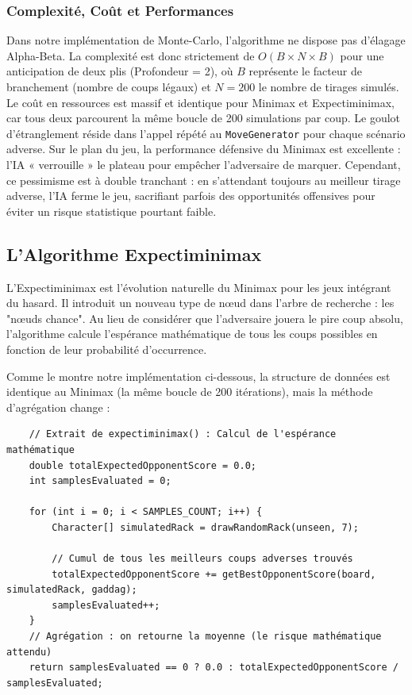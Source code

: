 \documentclass[a4paper]{article}
\begin{document}
    \subsubsection{Complexité, Coût et Performances}
	Dans notre implémentation de Monte-Carlo, l'algorithme ne dispose pas d'élagage Alpha-Beta. La complexité est donc strictement de $O(B \times N \times B)$ pour une anticipation de deux plis (Profondeur = 2), où $B$ représente le facteur de branchement (nombre de coups légaux) et $N=200$ le nombre de tirages simulés.
	Le coût en ressources est massif et identique pour Minimax et Expectiminimax, car tous deux parcourent la même boucle de 200 simulations par coup. Le goulot d'étranglement réside dans l'appel répété au \texttt{MoveGenerator} pour chaque scénario adverse.
	Sur le plan du jeu, la performance défensive du Minimax est excellente : l'IA « verrouille » le plateau pour empêcher l'adversaire de marquer. Cependant, ce pessimisme est à double tranchant : en s'attendant toujours au meilleur tirage adverse, l'IA ferme le jeu, sacrifiant parfois des opportunités offensives pour éviter un risque statistique pourtant faible.

    \subsection{L'Algorithme Expectiminimax}

    L'Expectiminimax est l'évolution naturelle du Minimax pour les jeux intégrant du hasard. Il introduit un nouveau type de nœud dans l'arbre de recherche : les "nœuds chance"\cite{uiuc_cs440_expectimax}. Au lieu de considérer que l'adversaire jouera le pire coup absolu, l'algorithme calcule l'espérance mathématique de tous les coups possibles en fonction de leur probabilité d'occurrence.

    Comme le montre notre implémentation ci-dessous, la structure de données est identique au Minimax (la même boucle de 200 itérations), mais la méthode d'agrégation change :

    \begin{verbatim}
    // Extrait de expectiminimax() : Calcul de l'espérance mathématique
    double totalExpectedOpponentScore = 0.0;
    int samplesEvaluated = 0;

    for (int i = 0; i < SAMPLES_COUNT; i++) {
        Character[] simulatedRack = drawRandomRack(unseen, 7);

        // Cumul de tous les meilleurs coups adverses trouvés
        totalExpectedOpponentScore += getBestOpponentScore(board, simulatedRack, gaddag);
        samplesEvaluated++;
    }
    // Agrégation : on retourne la moyenne (le risque mathématique attendu)
    return samplesEvaluated == 0 ? 0.0 : totalExpectedOpponentScore / samplesEvaluated;
    \end{verbatim}
\end{document}
